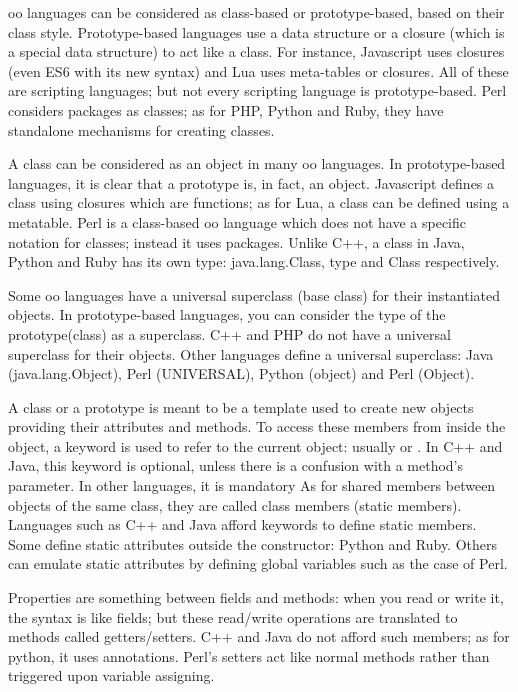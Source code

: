 \documentclass{KodeBook}
\begin{document}
\begin{discussion}
	
\ac{oo} languages can be considered as class-based or prototype-based, based on their class style. 
Prototype-based languages use a data structure or a closure (which is a special data structure) to act like a class. 
For instance, Javascript uses closures (even ES6 with its new syntax) and Lua uses meta-tables or closures. 
All of these are scripting languages; but not every scripting language is prototype-based. 
Perl considers packages as classes; as for PHP, Python and Ruby, they have standalone mechanisms for creating classes. 

A class can be considered as an object in many \ac{oo} languages. 
In prototype-based languages, it is clear that a prototype is, in fact, an object. 
Javascript defines a class using closures which are functions; as for Lua, a class can be defined using a metatable.
Perl is a class-based \ac{oo} language which does not have a specific notation for classes; instead it uses packages.
Unlike C++, a class in Java, Python and Ruby has its own type: java.lang.Class, type and Class respectively.

Some \ac{oo} languages have a universal superclass (base class) for their instantiated objects.
In prototype-based languages, you can consider the type of the prototype(class) as a superclass. 
C++ and PHP do not have a universal superclass for their objects. 
Other languages define a universal superclass: Java (java.lang.Object), Perl (UNIVERSAL), Python (object) and Perl (Object).

A class or a prototype is meant to be a template used to create new objects providing their attributes and methods. 
To access these members from inside the object, a keyword is used to refer to the current object: usually  or . 
In C++ and Java, this keyword is optional, unless there is a confusion with a method's parameter. 
In other languages, it is mandatory 
As for shared members between objects of the same class, they are called class members (static members). 
Languages such as C++ and Java afford keywords to define static members. 
Some define static attributes outside the constructor: Python and Ruby. 
Others can emulate static attributes by defining global variables such as the case of Perl.

Properties are something between fields and methods: when you read or write it, the syntax is like fields; but these read/write operations are translated to methods called getters/setters.
C++ and Java do not afford such members; as for python, it uses annotations. 
Perl's setters act like normal methods rather than triggered upon variable assigning.


\end{discussion}
\end{document}
